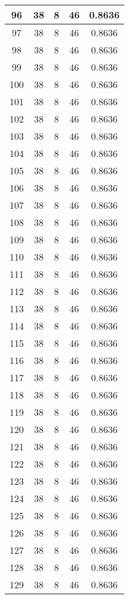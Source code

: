 \documentclass[letterpaper, 12pt]{article}
\begin{document}
\begin{longtable}{|c|c|c|c|c|}
\hline
96 & 38 & 8 & 46 & 0.8636 \\
\hline
97 & 38 & 8 & 46 & 0.8636 \\
\hline
98 & 38 & 8 & 46 & 0.8636 \\
\hline
99 & 38 & 8 & 46 & 0.8636 \\
\hline
100 & 38 & 8 & 46 & 0.8636 \\
\hline
101 & 38 & 8 & 46 & 0.8636 \\
\hline
102 & 38 & 8 & 46 & 0.8636 \\
\hline
103 & 38 & 8 & 46 & 0.8636 \\
\hline
104 & 38 & 8 & 46 & 0.8636 \\
\hline
105 & 38 & 8 & 46 & 0.8636 \\
\hline
106 & 38 & 8 & 46 & 0.8636 \\
\hline
107 & 38 & 8 & 46 & 0.8636 \\
\hline
108 & 38 & 8 & 46 & 0.8636 \\
\hline
109 & 38 & 8 & 46 & 0.8636 \\
\hline
110 & 38 & 8 & 46 & 0.8636 \\
\hline
111 & 38 & 8 & 46 & 0.8636 \\
\hline
112 & 38 & 8 & 46 & 0.8636 \\
\hline
113 & 38 & 8 & 46 & 0.8636 \\
\hline
114 & 38 & 8 & 46 & 0.8636 \\
\hline
115 & 38 & 8 & 46 & 0.8636 \\
\hline
116 & 38 & 8 & 46 & 0.8636 \\
\hline
117 & 38 & 8 & 46 & 0.8636 \\
\hline
118 & 38 & 8 & 46 & 0.8636 \\
\hline
119 & 38 & 8 & 46 & 0.8636 \\
\hline
120 & 38 & 8 & 46 & 0.8636 \\
\hline
121 & 38 & 8 & 46 & 0.8636 \\
\hline
122 & 38 & 8 & 46 & 0.8636 \\
\hline
123 & 38 & 8 & 46 & 0.8636 \\
\hline
124 & 38 & 8 & 46 & 0.8636 \\
\hline
125 & 38 & 8 & 46 & 0.8636 \\
\hline
126 & 38 & 8 & 46 & 0.8636 \\
\hline
127 & 38 & 8 & 46 & 0.8636 \\
\hline
128 & 38 & 8 & 46 & 0.8636 \\
\hline
129 & 38 & 8 & 46 & 0.8636 \\

\end{longtable}
\end{document}
